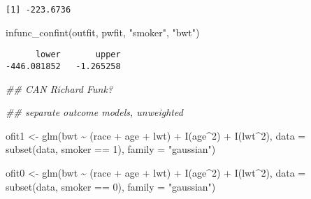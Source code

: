 \documentclass[
  letterpaper,
  DIV=11,
  numbers=noendperiod]{scrartcl}
\newenvironment{Shaded}{\begin{snugshade}}{\end{snugshade}}
\newcommand{\AttributeTok}[1]{\textcolor[rgb]{0.40,0.45,0.13}{#1}}
\newcommand{\DecValTok}[1]{\textcolor[rgb]{0.68,0.00,0.00}{#1}}
\newcommand{\DocumentationTok}[1]{\textcolor[rgb]{0.37,0.37,0.37}{\textit{#1}}}
\newcommand{\FunctionTok}[1]{\textcolor[rgb]{0.28,0.35,0.67}{#1}}
\newcommand{\NormalTok}[1]{\textcolor[rgb]{0.00,0.23,0.31}{#1}}
\newcommand{\OtherTok}[1]{\textcolor[rgb]{0.00,0.23,0.31}{#1}}
\newcommand{\SpecialCharTok}[1]{\textcolor[rgb]{0.37,0.37,0.37}{#1}}
\newcommand{\StringTok}[1]{\textcolor[rgb]{0.13,0.47,0.30}{#1}}
\begin{document}
\begin{verbatim}
[1] -223.6736
\end{verbatim}

\begin{Shaded}
\begin{Highlighting}[]
\FunctionTok{infunc\_confint}\NormalTok{(outfit, pwfit, }\StringTok{"smoker"}\NormalTok{, }\StringTok{"bwt"}\NormalTok{)}
\end{Highlighting}
\end{Shaded}

\begin{verbatim}
      lower       upper 
-446.081852   -1.265258 
\end{verbatim}

\begin{Shaded}
\begin{Highlighting}[]
\DocumentationTok{\#\# CAN Richard Funk?}

\DocumentationTok{\#\# separate outcome models, unweighted}

\NormalTok{ofit1 }\OtherTok{\textless{}{-}} \FunctionTok{glm}\NormalTok{(bwt }\SpecialCharTok{\textasciitilde{}}\NormalTok{ (race }\SpecialCharTok{+}\NormalTok{ age }\SpecialCharTok{+}\NormalTok{ lwt) }\SpecialCharTok{+} \FunctionTok{I}\NormalTok{(age}\SpecialCharTok{\^{}}\DecValTok{2}\NormalTok{) }\SpecialCharTok{+} \FunctionTok{I}\NormalTok{(lwt}\SpecialCharTok{\^{}}\DecValTok{2}\NormalTok{), }
              \AttributeTok{data =} \FunctionTok{subset}\NormalTok{(data, smoker }\SpecialCharTok{==} \DecValTok{1}\NormalTok{), }\AttributeTok{family =} \StringTok{"gaussian"}\NormalTok{)}

\NormalTok{ofit0 }\OtherTok{\textless{}{-}} \FunctionTok{glm}\NormalTok{(bwt }\SpecialCharTok{\textasciitilde{}}\NormalTok{ (race }\SpecialCharTok{+}\NormalTok{ age }\SpecialCharTok{+}\NormalTok{ lwt) }\SpecialCharTok{+} \FunctionTok{I}\NormalTok{(age}\SpecialCharTok{\^{}}\DecValTok{2}\NormalTok{) }\SpecialCharTok{+} \FunctionTok{I}\NormalTok{(lwt}\SpecialCharTok{\^{}}\DecValTok{2}\NormalTok{), }
              \AttributeTok{data =} \FunctionTok{subset}\NormalTok{(data, smoker }\SpecialCharTok{==} \DecValTok{0}\NormalTok{), }\AttributeTok{family =} \StringTok{"gaussian"}\NormalTok{)}



\end{Highlighting}
\end{Shaded}
\end{document}
